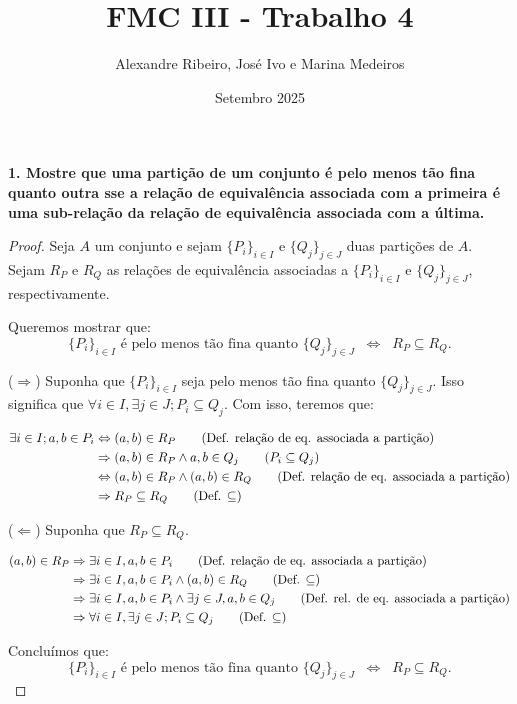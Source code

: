 \documentclass[12pt]{article}
\title{FMC III - Trabalho 4}
\author{Alexandre Ribeiro, José Ivo e Marina Medeiros}
\date{Setembro 2025}
\begin{document}
\maketitle

\textbf{1. Mostre que uma partição de um conjunto é pelo menos tão fina quanto outra sse a relação de equivalência associada com a primeira é uma sub-relação da relação de equivalência associada com a última.}

\begin{proof}
    Seja $A$ um conjunto e sejam $\{P_i\}_{i \in I}$ e $\{Q_j\}_{j \in J}$ duas partições de $A$.  
    Sejam $R_P$ e $R_Q$ as relações de equivalência associadas a $\{P_i\}_{i \in I}$ e $\{Q_j\}_{j \in J}$, respectivamente.

    Queremos mostrar que:
    \[
        \{P_i\}_{i \in I} \text{ é pelo menos tão fina quanto } \{Q_j\}_{j \in J}
        \;\;\Longleftrightarrow\;\;
        R_P \subseteq R_Q.
    \]

    ($\Rightarrow$) Suponha que $\{P_i\}_{i \in I}$ seja pelo menos tão fina quanto $\{Q_j\}_{j \in J}$. Isso significa que $\forall i \in I, \exists j \in J; P_i \subseteq Q_j$. Com isso, teremos que:
    
    \begin{align*}
        \exists i \in I; a, b \in P_i
        &\Leftrightarrow (a, b) \in R_P \tag{\text{Def. relação de eq. associada a partição}} \\
        &\Rightarrow (a, b) \in R_P \land a, b \in Q_j \tag{\text{$P_i \subseteq Q_j$}}\\
        &\Leftrightarrow (a, b) \in R_P \land (a, b) \in R_Q \qquad \text{(Def. relação de eq. associada a partição)} \\
        &\Rightarrow R_P \subseteq R_Q \tag{\text{Def. $\subseteq$}}\\
    \end{align*}

    \newpage

    ($\Leftarrow$) Suponha que $R_P \subseteq R_Q$.  
    
    \begin{align*}
        (a,b) \in R_P
        &\Rightarrow \exists i \in I, a, b \in P_i \qquad \text{(Def. relação de eq. associada a partição)} \\
        &\Rightarrow \exists i \in I, a, b \in P_i \land (a, b) \in R_Q\qquad \text{(Def. $\subseteq$)} \\
        &\Rightarrow \exists i \in I, a, b \in P_i \land \exists j \in J, a, b \in Q_j \qquad \text{(Def. rel. de eq. associada a partição)}\\
        &\Rightarrow \forall i \in I, \exists j \in J; P_i \subseteq Q_j \tag{\text{Def. $\subseteq$}}\\
    \end{align*}


    \medskip
    Concluímos que:
    \[
        \{P_i\}_{i \in I} \text{ é pelo menos tão fina quanto } \{Q_j\}_{j \in J}
        \;\;\Longleftrightarrow\;\;
        R_P \subseteq R_Q.
    \]
\end{proof}
\end{document}
